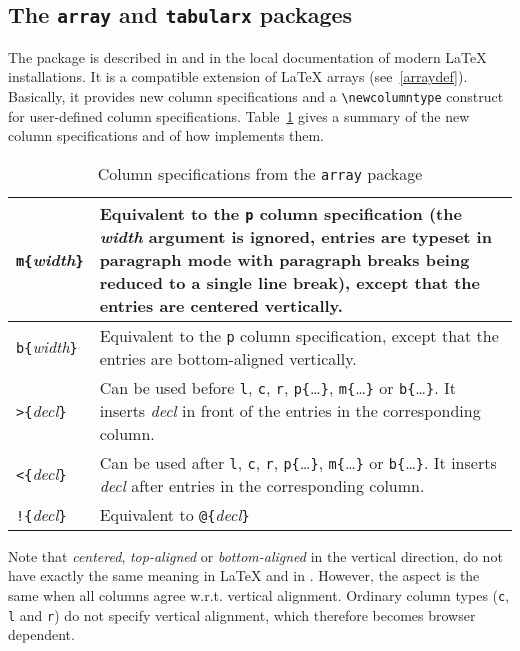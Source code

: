 \subsection{The \texttt{array} and \texttt{tabularx}
packages}\label{arraypack}
%
The 
package is described in
\cite[Section~5.3]{latexbis} and in the local documentation of modern \LaTeX{}
installations.
It is a compatible extension of \LaTeX{} arrays (see~\ref{arraydef}).
Basically, it provides new column specifications
and a \verb+\newcolumntype+ construct for user-defined  column
specifications.
Table~\ref{arraytable} gives a summary of the new column
specifications and of how \hevea{}
implements them.
\begin{table}
\caption{\label{arraytable} Column specifications from the
\texttt{array} package}
\begin{center}
\begin{tabular*}{.7\linewidth}{l@{\quad}p{.5\linewidth}}\hline
\verb+m{+\textit{width}\verb+}+ &
Equivalent to the \verb+p+ column specification (the \textit{width}
argument is ignored, entries are typeset in paragraph mode with
paragraph breaks being reduced to a single line break), except that the entries
are centered vertically.\\ \hline
\verb+b{+\textit{width}\verb+}+ &
Equivalent to the \verb+p+ column specification, except that the entries
are bottom-aligned vertically.\\ \hline
\verb+>{+\textit{decl}\verb+}+ &
Can be used before \verb+l+, \verb+c+, \verb+r+,
\verb+p{+\ldots\verb+}+, \verb+m{+\ldots\verb+}+ or
\verb+b{+\ldots\verb+}+.
It inserts \textit{decl} in front of the entries in the corresponding
column. \\ \hline
\verb+<{+\textit{decl}\verb+}+ &
Can be used after \verb+l+, \verb+c+, \verb+r+,
\verb+p{+\ldots\verb+}+, \verb+m{+\ldots\verb+}+ or
\verb+b{+\ldots\verb+}+.
It inserts \textit{decl} after entries in the corresponding
column. \\ \hline
\verb+!{+\textit{decl}\verb+}+ &
Equivalent to \verb+@{+\textit{decl}\verb+}+ \\ \hline
\end{tabular*}
\end{center}
\end{table}

Note that \emph{centered}, \emph{top-aligned} or \emph{bottom-aligned}
in the vertical direction, do not
have exactly the same meaning in \LaTeX{} and in \html{}. However, the
aspect is the same when all columns agree w.r.t. vertical alignment.
Ordinary column types (\verb+c+, \verb+l+ and \verb+r+)
do not specify vertical alignment, which therefore becomes browser
dependent.

